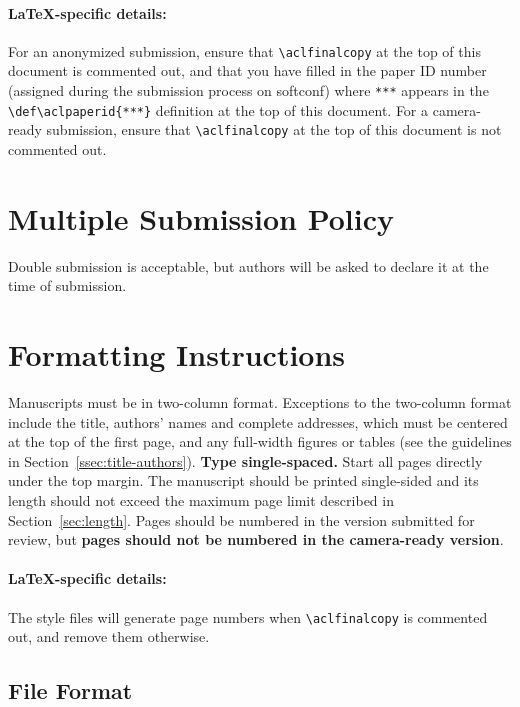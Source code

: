 \documentclass[11pt,a4paper]{article}
\begin{document}
\paragraph{\LaTeX-specific details:}
For an anonymized submission, ensure that {\small\verb|\aclfinalcopy|} at the top of this document is commented out, and that you have filled in the paper ID number (assigned during the submission process on softconf) where {\small\verb|***|} appears in the {\small\verb|\def\aclpaperid{***}|} definition at the top of this document.
For a camera-ready submission, ensure that {\small\verb|\aclfinalcopy|} at the top of this document is not commented out.


\section{Multiple Submission Policy}

Double submission is acceptable, but authors will be asked to declare it at the time of submission. 

\section{Formatting Instructions}

Manuscripts must be in two-column format.
Exceptions to the two-column format include the title, authors' names and complete addresses, which must be centered at the top of the first page, and any full-width figures or tables (see the guidelines in Section~\ref{ssec:title-authors}).
\textbf{Type single-spaced.}
Start all pages directly under the top margin.
The manuscript should be printed single-sided and its length should not exceed the maximum page limit described in Section~\ref{sec:length}.
Pages should be numbered in the version submitted for review, but \textbf{pages should not be numbered in the camera-ready version}.

\paragraph{\LaTeX-specific details:}
The style files will generate page numbers when {\small\verb|\aclfinalcopy|} is commented out, and remove them otherwise.


\subsection{File Format}
\label{sect:pdf}
\end{document}

